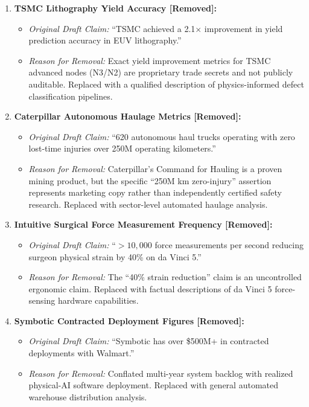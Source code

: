 \documentclass[11pt,a4paper]{article}
\begin{document}
\begin{enumerate}
    \item \textbf{TSMC Lithography Yield Accuracy [Removed]:}
    \begin{itemize}
        \item \textit{Original Draft Claim:} ``TSMC achieved a 2.1$\times$ improvement in yield prediction accuracy in EUV lithography.''
        \item \textit{Reason for Removal:} Exact yield improvement metrics for TSMC advanced nodes (N3/N2) are proprietary trade secrets and not publicly auditable. Replaced with a qualified description of physics-informed defect classification pipelines.
    \end{itemize}

    \item \textbf{Caterpillar Autonomous Haulage Metrics [Removed]:}
    \begin{itemize}
        \item \textit{Original Draft Claim:} ``620 autonomous haul trucks operating with zero lost-time injuries over 250M operating kilometers.''
        \item \textit{Reason for Removal:} Caterpillar's Command for Hauling is a proven mining product, but the specific ``250M km zero-injury'' assertion represents marketing copy rather than independently certified safety research. Replaced with sector-level automated haulage analysis.
    \end{itemize}

    \item \textbf{Intuitive Surgical Force Measurement Frequency [Removed]:}
    \begin{itemize}
        \item \textit{Original Draft Claim:} ``$>10,000$ force measurements per second reducing surgeon physical strain by 40\% on da Vinci 5.''
        \item \textit{Reason for Removal:} The ``40\% strain reduction'' claim is an uncontrolled ergonomic claim. Replaced with factual descriptions of da Vinci 5 force-sensing hardware capabilities.
    \end{itemize}

    \item \textbf{Symbotic Contracted Deployment Figures [Removed]:}
    \begin{itemize}
        \item \textit{Original Draft Claim:} ``Symbotic has over \$500M+ in contracted deployments with Walmart.''
        \item \textit{Reason for Removal:} Conflated multi-year system backlog with realized physical-AI software deployment. Replaced with general automated warehouse distribution analysis.
    \end{itemize}


\end{enumerate}
\end{document}

